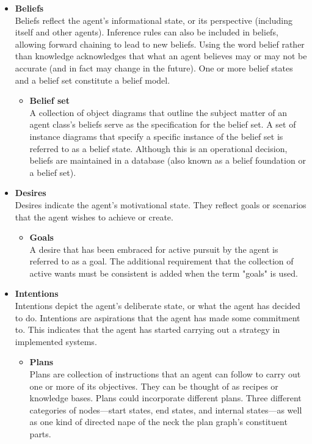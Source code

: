 \begin{itemize}
    \item \textbf{Beliefs} \\
    Beliefs reflect the agent's informational state, or its perspective (including itself and other agents). Inference rules can also be included in beliefs, allowing forward chaining to lead to new beliefs. Using the word belief rather than knowledge acknowledges that what an agent believes may or may not be accurate (and in fact may change in the future). One or more belief states and a belief set constitute a belief model.
 
    \begin{itemize}
        \item \textbf{Belief set} \\
        A collection of object diagrams that outline the subject matter of an agent class's beliefs serve as the specification for the belief set. A set of instance diagrams that specify a specific instance of the belief set is referred to as a belief state. Although this is an operational decision, beliefs are maintained in a database (also known as a belief foundation or a belief set).
    \end{itemize}

\item \textbf{Desires} \\
Desires indicate the agent's motivational state. They reflect goals or scenarios that the agent wishes to achieve or create.

    \begin{itemize}
        \item \textbf{Goals} \\
        A desire that has been embraced for active pursuit by the agent is referred to as a goal. The additional requirement that the collection of active wants must be consistent is added when the term "goals" is used.
    \end{itemize}

\item \textbf{Intentions} \\
Intentions depict the agent's deliberate state, or what the agent has decided to do. Intentions are aspirations that the agent has made some commitment to. This indicates that the agent has started carrying out a strategy in implemented systems.
    
    \vspace{.5cm}
    
    \begin{itemize}
        \item \textbf{Plans} \\
        Plans are collection of instructions that an agent can follow to carry out one or more of its objectives. They can be thought of as recipes or knowledge bases. Plans could incorporate different plans. Three different categories of nodes—start states, end states, and internal states—as well as one kind of directed nape of the neck the plan graph's constituent parts.
        

\end{itemize}
\end{itemize}
